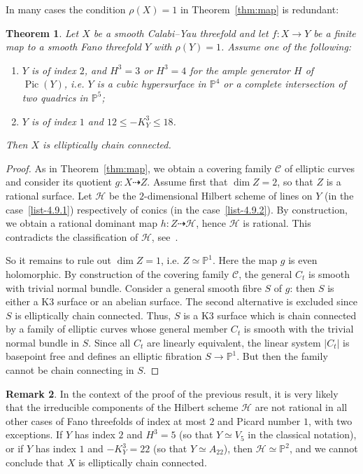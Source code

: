 \documentclass[11pt]{article}
\newtheorem{theo}{Theorem}[section]
\theoremstyle{definition}
\newtheorem{rema}[theo]{Remark}
\numberwithin{equation}{section}
\numberwithin{figure}{section}
\numberwithin{table}{section}
\DeclareMathOperator{\Pic}{Pic}
\newcommand{\PS}{\mathbb{P}}
\newcommand\sC{\mathcal{C}}
\newcommand\sH{\mathcal{H}}
\newcommand*{\romanenumi}{\renewcommand*{\theenumi}{\roman{enumi}}}
\begin{document}
In many cases the condition $\rho (X) = 1$ in Theorem~\ref{thm:map} is redundant:

\begin{theo}\label{thm:map2}
Let $X$ be a smooth Calabi--Yau threefold and let $f\colon X \to Y$ be a finite map to a smooth Fano threefold $Y$ with $\rho(Y) = 1$. Assume one of the following:
\begin{enumerate}\romanenumi
\item \label{list-4.9.1} $Y$ is of index $2$, and $H^3 = 3$ or $H^3 = 4$ for the ample generator $H$ of ${\Pic}(Y)$, i.e. $Y$ is a cubic hypersurface in $\PS^4$ or a complete intersection of two quadrics in $\PS^5$;
\item \label{list-4.9.2} $Y$ is of index $1$ and $12 \leq -K_Y^3 \leq 18$.
\end{enumerate}
Then $X$ is elliptically chain connected.
\end{theo}

\begin{proof}
As in Theorem~\ref{thm:map}, we obtain a covering family $\sC$ of elliptic curves and consider its quotient $g\colon X \dasharrow Z$. Assume first that $\dim Z = 2$, so that $Z$ is a rational surface. Let $\sH$ be the $2$-dimensional Hilbert scheme of lines on $Y$ (in the case~\eqref{list-4.9.1}) respectively of conics (in the case~\eqref{list-4.9.2}). By construction, we obtain a rational dominant map $h\colon Z \dasharrow \sH$, hence $\sH$ is rational. This contradicts the classification of $\sH$, see~\cite{KPS16}.

So it remains to rule out $\dim Z = 1$, i.e. $Z \simeq \PS^1$. Here the map $g$ is even holomorphic. By construction of the covering family $\sC$, the general $C_t$ is smooth with trivial normal bundle. Consider a general smooth fibre $S$ of $g$: then $S$ is either a K3 surface or an abelian surface. The second alternative is excluded since $S$ is elliptically chain connected. Thus, $S$ is a K3 surface which is chain connected by a family of elliptic curves whose general member $C_t$ is smooth with the trivial normal bundle in $S$. Since all $C_t$ are linearly equivalent, the linear system $|C_t|$ is basepoint free and defines an elliptic fibration $S \to \PS^1$. But then the family cannot be chain connecting in $S$.
\end{proof}

\begin{rema}\label{rema:main4.10}
In the context of the proof of the previous result, it is very likely that the irreducible components of the Hilbert scheme $\sH$ are not rational in all other cases of Fano threefolds of index at most $2$ and Picard number $1$, with two exceptions. If $Y$ has index $2$ and $H^3 = 5$ (so that $Y\simeq V_5$ in the classical notation), or if $Y$ has index $1$ and ${-}K_Y^3 = 22 $ (so that $Y\simeq A_{22}$), then $\sH \simeq \PS^2$, and we cannot conclude that $X$ is elliptically chain connected.
\end{rema}
\end{document}
